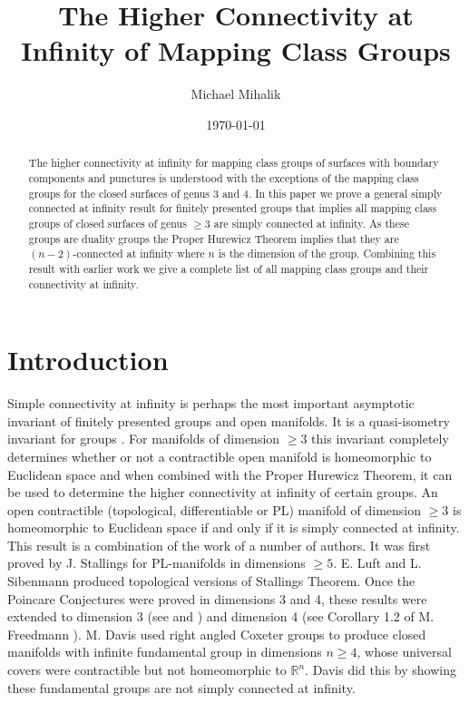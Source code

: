 \documentclass[12pt]{article}
\title{The Higher Connectivity at Infinity of Mapping Class Groups}
\author{Michael Mihalik}
\date{\today}
\numberwithin{equation}{section}
\begin{document}
\maketitle


\begin{abstract} 
The higher connectivity at infinity for mapping class groups of surfaces with boundary components and punctures is understood with the exceptions of the mapping class groups for the closed surfaces of genus 3 and 4. In this paper we prove a general simply connected at infinity result for finitely presented groups that implies all mapping class groups of closed surfaces of genus $\geq 3$ are simply connected at infinity. As these groups are duality groups the Proper Hurewicz Theorem implies that they are $(n-2)$-connected at infinity where $n$ is the dimension of the group. Combining this result with earlier work we give a complete list of all mapping class groups and their connectivity at infinity.
\end{abstract}

\maketitle

\section{Introduction}
Simple connectivity at infinity is perhaps the most important asymptotic invariant of finitely presented groups and open manifolds. It is a quasi-isometry invariant for groups \cite{BR93}. For manifolds of dimension $\geq 3$ this invariant completely determines whether or not a contractible open manifold is homeomorphic to Euclidean space and when combined with the Proper Hurewicz Theorem, it can be used to determine the higher connectivity at infinity of certain groups. An open contractible (topological, differentiable or PL) manifold of dimension $\geq 3$ is homeomorphic to Euclidean space if and only if it is simply connected at infinity. This result is a combination of the work of a number of authors. It was first proved by J. Stallings \cite{St62} for PL-manifolds in dimensions $\geq 5$. E. Luft \cite{Luf67} and L. Sibenmann \cite{Sie68} produced topological versions of Stallings Theorem. Once the Poincare Conjectures were proved in dimensions 3 and 4, these results were extended to dimension 3 (see \cite{HP70} and \cite{HP71}) and dimension 4 (see Corollary 1.2 of M. Freedmann \cite{Fre82}). M. Davis \cite{Davis83} used right angled Coxeter groups to produce closed manifolds with infinite fundamental group in dimensions $n\geq 4$, whose universal covers were contractible but not homeomorphic to $\mathbb R^n$. Davis did this by showing these fundamental groups are not simply connected at infinity.
\end{document}
